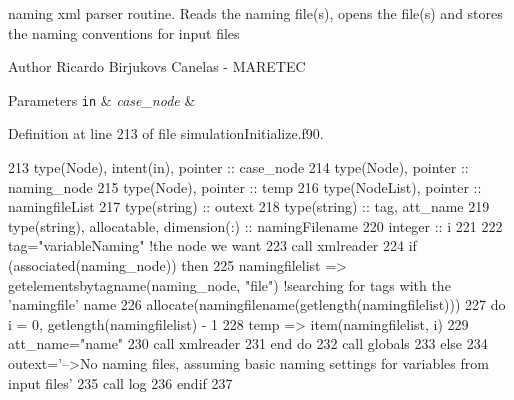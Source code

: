naming xml parser routine. Reads the naming file(s), opens the file(s) and stores the naming conventions for input files 

\begin{DoxyAuthor}{Author}
Ricardo Birjukovs Canelas -\/ M\+A\+R\+E\+T\+EC 
\end{DoxyAuthor}

\begin{DoxyParams}[1]{Parameters}
\mbox{\tt in}  & {\em case\+\_\+node} & \\
\hline
\end{DoxyParams}


Definition at line 213 of file simulation\+Initialize.\+f90.


\begin{DoxyCode}
213     \textcolor{keywordtype}{type}(Node), \textcolor{keywordtype}{intent(in)}, \textcolor{keywordtype}{pointer} :: case\_node
214     \textcolor{keywordtype}{type}(Node), \textcolor{keywordtype}{pointer} :: naming\_node
215     \textcolor{keywordtype}{type}(Node), \textcolor{keywordtype}{pointer} :: temp
216     \textcolor{keywordtype}{type}(NodeList), \textcolor{keywordtype}{pointer} :: namingfileList
217     \textcolor{keywordtype}{type}(string) :: outext
218     \textcolor{keywordtype}{type}(string) :: tag, att\_name
219     \textcolor{keywordtype}{type}(string), \textcolor{keywordtype}{allocatable}, \textcolor{keywordtype}{dimension(:)} :: namingFilename
220     \textcolor{keywordtype}{integer} :: i
221 
222     tag=\textcolor{stringliteral}{"variableNaming"}    \textcolor{comment}{!the node we want}
223     \textcolor{keyword}{call }xmlreader%
224     \textcolor{keywordflow}{if} (\textcolor{keyword}{associated}(naming\_node)) \textcolor{keywordflow}{then}
225         namingfilelist => getelementsbytagname(naming\_node, \textcolor{stringliteral}{"file"})       \textcolor{comment}{!searching for tags with the
       'namingfile' name}
226         \textcolor{keyword}{allocate}(namingfilename(getlength(namingfilelist)))
227         \textcolor{keywordflow}{do} i = 0, getlength(namingfilelist) - 1
228             temp => item(namingfilelist, i)
229             att\_name=\textcolor{stringliteral}{"name"}
230             \textcolor{keyword}{call }xmlreader%
231 \textcolor{keywordflow}{        end do}
232         \textcolor{keyword}{call }globals%
233     \textcolor{keywordflow}{else}
234         outext=\textcolor{stringliteral}{'-->No naming files, assuming basic naming settings for variables from input files'}
235         \textcolor{keyword}{call }log%
236 \textcolor{keywordflow}{    endif}
237 
\end{DoxyCode}
